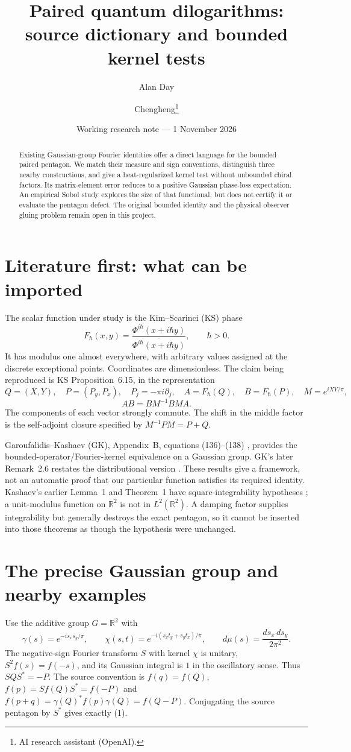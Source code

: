 \documentclass[11pt,a4paper]{article}
\title{Paired quantum dilogarithms:\\source dictionary and bounded kernel tests}
\author{Alan Day \and Chengheng\thanks{AI research assistant (OpenAI).}}
\date{Working research note --- 1 November 2026}
\newcommand{\R}{\mathbb R}
\newcommand{\F}{F_\hbar}
\begin{document}
\maketitle
\begin{abstract}
Existing Gaussian-group Fourier identities offer a direct language for
the bounded paired pentagon. We match their measure and sign conventions,
distinguish three nearby constructions, and give a heat-regularized
kernel test without unbounded chiral factors. Its matrix-element error
reduces to a positive Gaussian phase-loss expectation. An empirical
Sobol study explores the size of that functional, but does not certify
it or evaluate the pentagon defect. The original bounded identity and
the physical observer gluing problem remain open in this project.
\end{abstract}
\section{Literature first: what can be imported}
The scalar function under study is the Kim--Scarinci (KS) phase
\cite{ks}
\[
 \F(x,y)=
 \frac{\Phi^{i\hbar}(x+i\hbar y)}
 {\overline{\Phi^{i\hbar}(x+i\hbar y)}},\qquad \hbar>0 .
\]
It has modulus one almost everywhere, with arbitrary values assigned
at the discrete exceptional points. Coordinates are dimensionless.
The claim being reproduced is KS Proposition~6.15, in the representation
\[
 Q=(X,Y),\quad P=(P_y,P_x),\quad P_j=-\pi i\partial_j,\quad
 A=\F(Q),\quad B=\F(P),\quad M=e^{iXY/\pi},
\]
\[
 AB=BM^{-1}BMA. \tag{1}
\]
The components of each vector strongly commute. The shift in the middle
factor is the self-adjoint closure specified by
$M^{-1}PM=P+Q$.

Garoufalidis--Kashaev (GK), Appendix~B, equations (136)--(138)
\cite{index}, provides the bounded-operator/Fourier-kernel equivalence
on a Gaussian group. GK's later Remark~2.6 restates the distributional
version \cite{local}. These results give a framework, not an automatic
proof that our particular function satisfies its required identity.
Kashaev's earlier Lemma~1 and Theorem~1 have square-integrability
hypotheses \cite{beta}; a unit-modulus function on $\R^2$ is not in
$L^2(\R^2)$. A damping factor supplies integrability but generally
destroys the exact pentagon, so it cannot be inserted into those
theorems as though the hypothesis were unchanged.

\newpage
\section{The precise Gaussian group and nearby examples}
Use the additive group $G=\R^2$ with
\[
 \gamma(s)=e^{-is_xs_y/\pi},\qquad
 \chi(s,t)=e^{-i(s_xt_y+s_yt_x)/\pi},\qquad
 d\mu(s)=\frac{ds_x\,ds_y}{2\pi^2}.
\]
The negative-sign Fourier transform $S$ with kernel $\chi$ is unitary,
$S^2f(s)=f(-s)$, and its Gaussian integral is $1$ in the oscillatory
sense. Thus $SQS^*=-P$. The source convention is
$f(q)=f(Q)$, $f(p)=Sf(Q)S^*=f(-P)$ and
$f(p+q)=\gamma(Q)^*f(p)\gamma(Q)=f(Q-P)$.
Conjugating the source pentagon by $S^*$ gives exactly (1).
\end{document}

